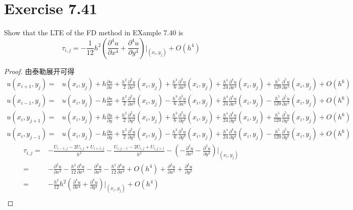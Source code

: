 \documentclass[twoside,a4paper]{ctexart}
\newcommand{\pdfFrac}[2]{\frac{\partial #1}{\partial #2}}
\begin{document}
\section*{Exercise 7.41}
Show that the LTE of the FD method in EXample 7.40 is
\begin{equation*}
  \tau_{i,j} = -\frac{1}{12}h^2\left(\frac{\partial^4 u}{\partial x^4}+\frac{\partial^4 u}{\partial y^4}\right)\bigg|_{(x_i,y_j)} + O(h^4)
\end{equation*}
\begin{proof}
  由泰勒展开可得
  \begin{align*}
    u(x_{i+1},y_j) ={} & u(x_i,y_j) + h\pdfFrac{u}{x} + \frac{h^2}{2}\pdfFrac{^2u}{x^2}(x_i,y_j) + \frac{h^3}{6}\pdfFrac{^3u}{x^3}(x_i,y_j) + \frac{h^4}{24}\pdfFrac{^4u}{x^4}(x_i,y_j) + \frac{h^5}{120}\pdfFrac{^5u}{x^5}(x_i,y_j) + O(h^6) \\
    u(x_{i-1},y_j) ={} & u(x_i,y_j) - h\pdfFrac{u}{x} + \frac{h^2}{2}\pdfFrac{^2u}{x^2}(x_i,y_j) - \frac{h^3}{6}\pdfFrac{^3u}{x^3}(x_i,y_j) + \frac{h^4}{24}\pdfFrac{^4u}{x^4}(x_i,y_j) - \frac{h^5}{120}\pdfFrac{^5u}{x^5}(x_i,y_j) + O(h^6) \\
    u(x_{i},y_{j+1}) ={} & u(x_i,y_j) + h\pdfFrac{u}{y} + \frac{h^2}{2}\pdfFrac{^2u}{y^2}(x_i,y_j) + \frac{h^3}{6}\pdfFrac{^3u}{y^3}(x_i,y_j) + \frac{h^4}{24}\pdfFrac{^4u}{y^4}(x_i,y_j) + \frac{h^5}{120}\pdfFrac{^5u}{y^5}(x_i,y_j) + O(h^6) \\
    u(x_{i},y_{j-1}) ={} & u(x_i,y_j) - h\pdfFrac{u}{y} + \frac{h^2}{2}\pdfFrac{^2u}{y^2}(x_i,y_j) - \frac{h^3}{6}\pdfFrac{^3u}{y^3}(x_i,y_j) + \frac{h^4}{24}\pdfFrac{^4u}{y^4}(x_i,y_j) - \frac{h^5}{120}\pdfFrac{^5u}{y^5}(x_i,y_j) + O(h^6)
  \end{align*}
    \begin{align*}
    \tau_{i,j} ={} & -\frac{U_{i-1,j}-2U_{i,j}+U_{i+1,j}}{h^2} - \frac{U_{i,j-1}-2U_{i,j}+U_{i,j+1}}{h^2} - \left( -\pdfFrac{^2u}{x^2}-\pdfFrac{^2u}{y^2}\right)\bigg|_{(x_i,y_j)} \\
    ={} & -\pdfFrac{^2u}{x^2} - \frac{h^2}{12}\pdfFrac{^4u}{x^4} - \pdfFrac{^2u}{x^2} - \frac{h^2}{12}\pdfFrac{^4u}{x^4} + O(h^4) +\pdfFrac{^2u}{x^2} + \pdfFrac{^2u}{y^2} \\
    ={} & -\frac{h^2}{12}h^2\left(\frac{\partial^4 u}{\partial x^4}+\frac{\partial^4 u}{\partial y^4}\right)\bigg|_{(x_i,y_j)} + O(h^4) \\
    \end{align*}
    
  \end{proof}
\end{document}
